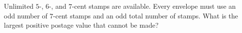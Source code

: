 Unlimited $5$-, $6$-, and $7$-cent stamps are available. Every envelope must use an odd number of $7$-cent stamps and an odd total number of stamps. What is the largest positive postage value that cannot be made?
